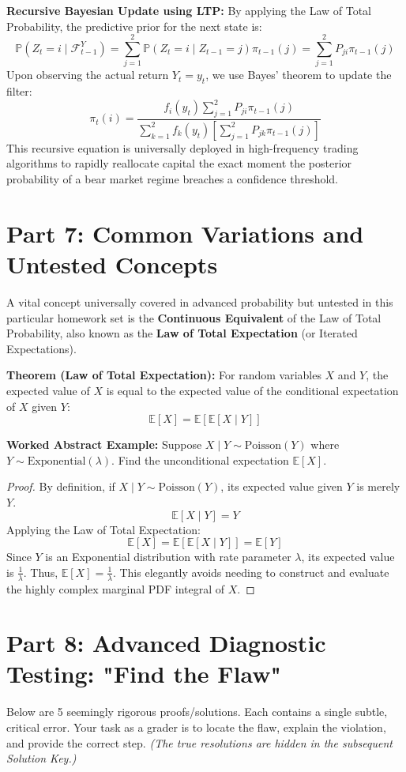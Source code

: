 \documentclass[12pt]{article}
\begin{document}
\textbf{Recursive Bayesian Update using LTP:}
By applying the Law of Total Probability, the predictive prior for the next state is:
\[ \mathbb{P}(Z_t = i \mid \mathcal{F}^Y_{t-1}) = \sum_{j=1}^2 \mathbb{P}(Z_t = i \mid Z_{t-1} = j) \pi_{t-1}(j) = \sum_{j=1}^2 P_{ji} \pi_{t-1}(j) \]
Upon observing the actual return $Y_t = y_t$, we use Bayes' theorem to update the filter:
\[ \pi_t(i) = \frac{f_i(y_t) \sum_{j=1}^2 P_{ji} \pi_{t-1}(j)}{\sum_{k=1}^2 f_k(y_t) \left[ \sum_{j=1}^2 P_{jk} \pi_{t-1}(j) \right]} \]
This recursive equation is universally deployed in high-frequency trading algorithms to rapidly reallocate capital the exact moment the posterior probability of a bear market regime breaches a confidence threshold.

\newpage
\section{Part 7: Common Variations and Untested Concepts}

A vital concept universally covered in advanced probability but untested in this particular homework set is the \textbf{Continuous Equivalent} of the Law of Total Probability, also known as the \textbf{Law of Total Expectation} (or Iterated Expectations).

\textbf{Theorem (Law of Total Expectation):} For random variables $X$ and $Y$, the expected value of $X$ is equal to the expected value of the conditional expectation of $X$ given $Y$:
\[ \mathbb{E}[X] = \mathbb{E}[\mathbb{E}[X \mid Y]] \]

\textbf{Worked Abstract Example:} Suppose $X \mid Y \sim \text{Poisson}(Y)$ where $Y \sim \text{Exponential}(\lambda)$. Find the unconditional expectation $\mathbb{E}[X]$.
\begin{proof}
By definition, if $X \mid Y \sim \text{Poisson}(Y)$, its expected value given $Y$ is merely $Y$.
\[ \mathbb{E}[X \mid Y] = Y \]
Applying the Law of Total Expectation:
\[ \mathbb{E}[X] = \mathbb{E}[\mathbb{E}[X \mid Y]] = \mathbb{E}[Y] \]
Since $Y$ is an Exponential distribution with rate parameter $\lambda$, its expected value is $\frac{1}{\lambda}$.
Thus, $\mathbb{E}[X] = \frac{1}{\lambda}$.
This elegantly avoids needing to construct and evaluate the highly complex marginal PDF integral of $X$.
\end{proof}

\newpage
\section{Part 8: Advanced Diagnostic Testing: "Find the Flaw"}
Below are 5 seemingly rigorous proofs/solutions. Each contains a single subtle, critical error. Your task as a grader is to locate the flaw, explain the violation, and provide the correct step. \textit{(The true resolutions are hidden in the subsequent Solution Key.)}
\end{document}
